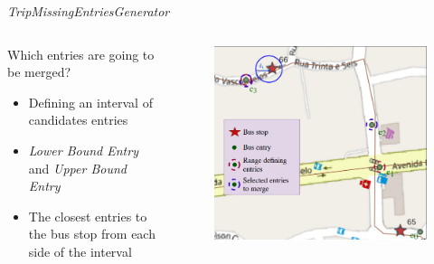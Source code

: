 \documentclass[xcolor=dvipsnames,table]{beamer}
\begin{document}
\begin{frame}{\textit{TripMissingEntriesGenerator}}
        \begin{columns}
                \begin{block}{Which entries are going to be merged?}
                        \begin{itemize}
                                \item Defining an interval of candidates entries
                                \item {\em Lower Bound Entry} and {\em Upper Bound Entry}
                                \item The closest entries to the bus stop from each side of the interval
                        \end{itemize}
                \end{block}
                \begin{figure}[h]
                        \centering
                        \includegraphics[width=\textwidth]{images/9202_hard.png}
                \end{figure}
        \end{columns}
\end{frame}
\end{document}
